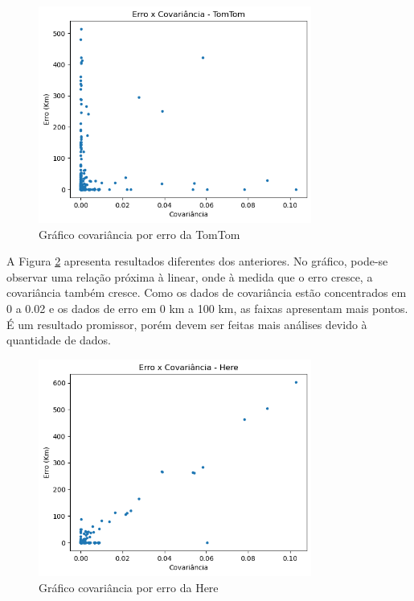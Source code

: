\begin{figure}[h]
  \centering
  \includegraphics[width=0.8\textwidth]{Figuras/ErroCovT.png}
  \caption{Gráfico covariância por erro da TomTom}
  \label{fig:CovErroT}
\end{figure}

A Figura \ref{fig:CovErroH} apresenta resultados diferentes dos anteriores. No gráfico, pode-se observar uma relação próxima à linear, onde à medida que o erro cresce, a covariância também cresce. Como os dados de covariância estão concentrados em 0 a 0.02 e os dados de erro em 0 km a 100 km, as faixas apresentam mais pontos. É um resultado promissor, porém devem ser feitas mais análises devido à quantidade de dados.


\begin{figure}[h]
  \centering
  \includegraphics[width=0.8\textwidth]{Figuras/ErroCovH.png}
  \caption{Gráfico covariância por erro da Here}
  \label{fig:CovErroH}
\end{figure}

